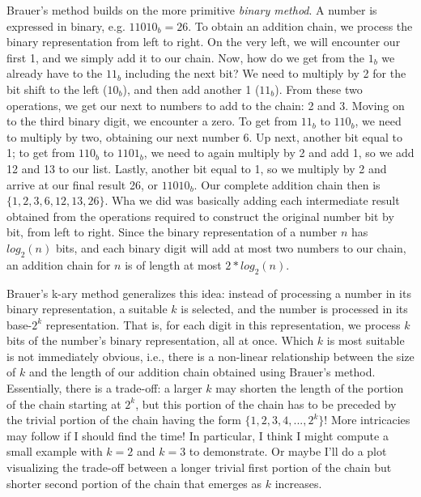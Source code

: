 \documentclass{article}
\begin{document}
Brauer's method builds on the more primitive \emph{binary method}. A number is expressed in binary, e.g. $11010_b = 26$. To obtain an addition chain, we process the binary representation from left to right. On the very left, we will encounter our first 1, and we simply add it to our chain. Now, how do we get from the $1_b$ we already have to the $11_b$ including the next bit? We need to multiply by 2 for the bit shift to the left ($10_b$), and then add another 1 ($11_b$). From these two operations, we get our next to numbers to add to the chain: 2 and 3. Moving on to the third binary digit, we encounter a zero. To get from $11_b$ to $110_b$, we need to multiply by two, obtaining our next number 6. Up next, another bit equal to 1; to get from $110_b$ to $1101_b$, we need to again multiply by 2 and add 1, so we add 12 and 13 to our list. Lastly, another bit equal to 1, so we multiply by 2 and arrive at our final result 26, or $11010_b$. Our complete addition chain then is $\{1,2,3,6,12,13,26\}$. Wha we did was basically adding each intermediate result obtained from the operations required to construct the original number bit by bit, from left to right. Since the binary representation of a number $n$ has $log_2(n)$ bits, and each binary digit will add at most two numbers to our chain, an addition chain for $n$ is of length at most $2*log_2(n)$.\medskip

Brauer's k-ary method generalizes this idea: instead of processing a number in its binary representation, a suitable $k$ is selected, and the number is processed in its base-$2^k$ representation. That is, for each digit in this representation, we process $k$ bits of the number's binary representation, all at once. Which $k$ is most suitable is not immediately obvious, i.e., there is a non-linear relationship between the size of $k$ and the length of our addition chain obtained using Brauer's method. Essentially, there is a trade-off: a larger $k$ may shorten the length of the portion of the chain starting at $2^k$, but this portion of the chain has to be preceded by the trivial portion of the chain having the form $\{1,2,3,4, ... , 2^k\}$! More intricacies may follow if I should find the time! In particular, I think I might compute a small example with $k=2$ and $k=3$ to demonstrate. Or maybe I'll do a plot visualizing the trade-off between a longer trivial first portion of the chain but shorter second portion of the chain that emerges as $k$ increases.
\end{document}
